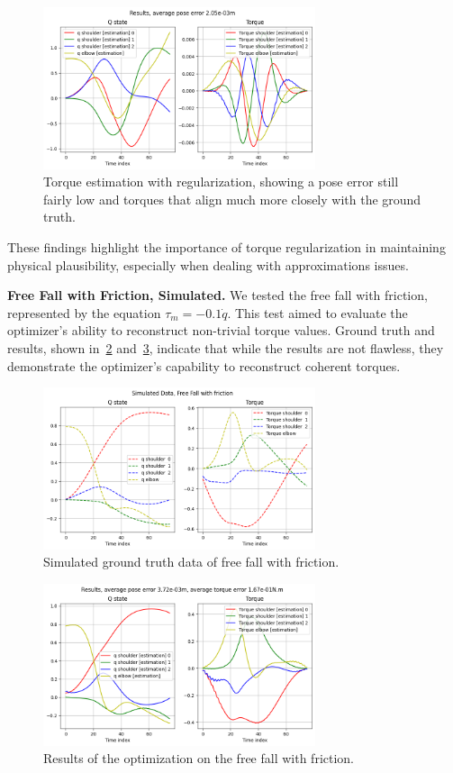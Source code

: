 \begin{figure}
    \centering
    \includegraphics[width=8cm]{figures/free_fall_torque.png}
    \caption{Torque estimation with regularization, showing a pose error still fairly low and torques that align much more closely with the ground truth.}
    \label{fig:free_fall_torque}
\end{figure}

These findings highlight the importance of torque regularization in maintaining physical plausibility, especially when dealing with 
approximations issues.

\noindent\textbf{Free Fall with Friction, Simulated.} We tested the free fall with friction, represented by the equation 
\(\tau_m = -0.1\dot{q}\). This test aimed to evaluate the optimizer's ability to reconstruct non-trivial torque values. Ground truth and results, 
shown in~\cref{fig:free_fall_friction_gt} and~\cref{fig:free_fall_friction}, indicate that while the results are not flawless, 
they demonstrate the optimizer's capability to reconstruct coherent torques.

\begin{figure}
    \centering
    \includegraphics[width=8cm]{figures/free_fall_friction_gt.png}
    \caption{Simulated ground truth data of free fall with friction.}
    \label{fig:free_fall_friction_gt}
\end{figure}

\begin{figure}
    \centering
    \includegraphics[width=8cm]{figures/free_fall_friction.png}
    \caption{Results of the optimization on the free fall with friction.}
    \label{fig:free_fall_friction}
\end{figure}


